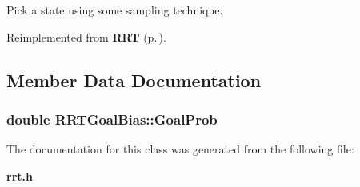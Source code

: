 Pick a state using some sampling technique.



Reimplemented from {\bf RRT} {\rm (p.\,\pageref{class_RRT_b4})}.

\subsection{Member Data Documentation}
\subsubsection{\setlength{\rightskip}{0pt plus 5cm}double RRTGoal\-Bias::Goal\-Prob}\label{class_RRTGoalBias_m0}




The documentation for this class was generated from the following file:\begin{CompactItemize}
\item 
{\bf rrt.h}\end{CompactItemize}
